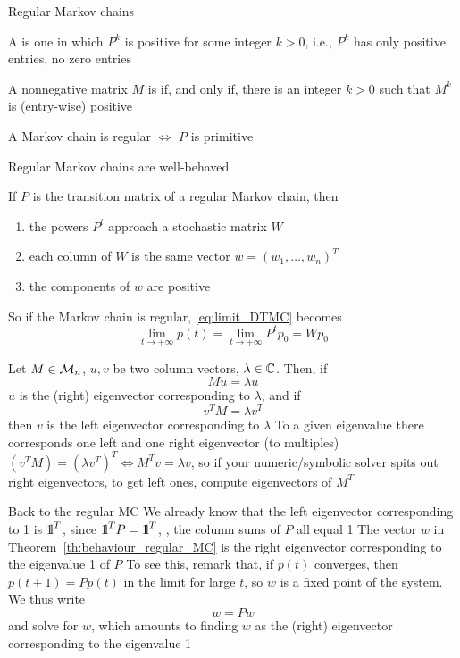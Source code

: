 \documentclass[aspectratio=169]{beamer}
\begin{document}
\begin{frame}{Regular Markov chains}
\begin{definition}
A  is one in which $P^k$ is positive for some integer $k>0$, i.e., $P^k$ has only positive entries, no zero entries
\end{definition}
\vfill
\begin{definition}
A nonnegative matrix $M$ is  if, and only if, there is an integer $k>0$ such that $M^k$ is (entry-wise) positive
\end{definition}
\vfill
\begin{theorem}
A Markov chain is regular $\iff$ $P$ is primitive
\end{theorem}
\end{frame}

\begin{frame}{Regular Markov chains are well-behaved}
\begin{theorem}\label{th:behaviour_regular_MC}
If $P$ is the transition matrix of a regular Markov chain, then
\begin{enumerate}
\item the powers $P^t$ approach a stochastic matrix $W$
\item each column of $W$ is the same vector $w=(w_1,\ldots,w_n)^T$
\item the components of $w$ are positive
\end{enumerate}
\end{theorem}
\vfill
So if the Markov chain is regular, \eqref{eq:limit_DTMC} becomes
\[
\lim_{t\rightarrow +\infty}p(t)=\lim_{t\rightarrow +\infty}P^tp_0
=Wp_0
\]
\end{frame}

\begin{frame} 
Let $M\in\mathcal{M}_n$, $u,v$ be two column vectors, $\lambda\in\mathbb{C}$. Then, if  
\[
Mu=\lambda u
\]
$u$ is the (right) eigenvector corresponding to $\lambda$, and if
\[
v^TM=\lambda v^T
\]
then $v$ is the left eigenvector corresponding to $\lambda$
\vfill 
To a given eigenvalue there corresponds one left and one right eigenvector (to multiples)
\vfill
$(v^TM)=(\lambda v^T)^T\iff M^Tv=\lambda v$, so if your numeric/symbolic solver spits out right eigenvectors, to get left ones, compute eigenvectors of $M^T$
\end{frame}

\begin{frame}{Back to the regular MC}
We already know that the left eigenvector corresponding to 1 is $\nbOne^T$, since $\nbOne^TP=\nbOne^T$, \ie, the column sums of $P$ all equal 1
\vfill
The vector $w$ in Theorem~\ref{th:behaviour_regular_MC} is the right eigenvector corresponding to the eigenvalue 1 of $P$
\vfill
To see this, remark that, if $p(t)$ converges, then $p(t+1)=Pp(t)$ in the limit for large $t$, so $w$ is a fixed point of the system. We thus write
\[
w=Pw
\]
and solve for $w$, which amounts to finding $w$ as the (right) eigenvector corresponding to the eigenvalue 1
\end{frame}
\end{document}
